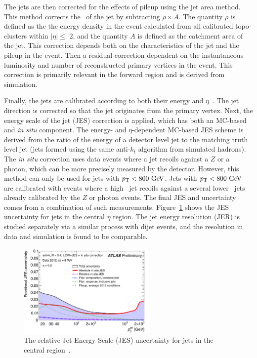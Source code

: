 The jets are then corrected for the effects of pileup using the jet area method. This method corrects the \pt\ of the jet by subtracting $\rho\times A$. The quantity $\rho$ is defined as the  the energy density in the event calculated from all calibrated topo-clusters within $|\eta|\leq$ 2, and the quantity $A$ is defined as the catchment area of the jet. This correction depends both on the characteristics of the jet and the pileup in the event. Then a residual correction dependent on the instantaneous luminosity and number of reconstructed primary vertices in the event. This correction is primarily relevant in the forward region and is derived from simulation.

Finally, the jets are calibrated according to both their energy and $\eta$~\cite{JES}. The jet direction is corrected so that the jet originates from the primary vertex. Next, the energy scale of the jet (JES) correction is applied, which has both an MC-based and \emph{in situ} component. The energy- and $\eta$-dependent MC-based JES scheme is derived from the ratio of the energy of a detector level jet to the matching truth level jet (jets formed using the same anti-$k_t$ algorithm from simulated hadrons). The \emph{in situ} correction uses data events where a jet recoils against a $Z$ or a photon, which can be more precisely measured by the detector. However, this method can only be used for jets with $\pt<800 \gev$. Jets with $\pt<800 \gev$ are calibrated with events where a high \pt\ jet recoils against a several lower \pt\ jets already calibrated by the $Z$ or photon events. The final JES and uncertainty comes from a combination of such measurements. Figure~\ref{fig:jesex} shows the JES uncertainty for jets in the central $\eta$ region. The jet energy resolution (JER) is studied separately via a similar process with dijet events, and the resolution in data and simulation is found to be comparable.

\begin{figure}[hp]
\centering
\includegraphics[width=0.6\textwidth]{fig/obj/smalljesunc.pdf}
\caption{The relative Jet Energy Scale (JES) uncertainty for jets in the central region~\cite{JES}.}
\label{fig:jesex}
\end{figure}

